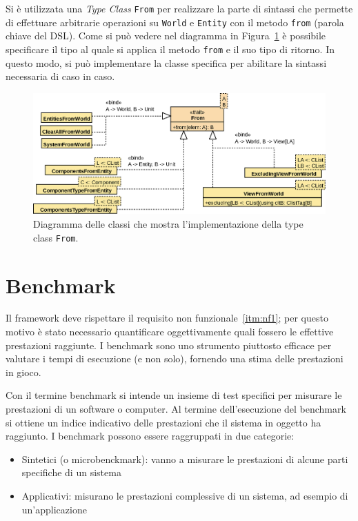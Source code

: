 

Si è utilizzata una \textit{Type Class} \texttt{From} per realizzare la parte di sintassi che permette di effettuare
arbitrarie operazioni su \texttt{World} e \texttt{Entity} con il metodo \texttt{from} (parola chiave del DSL).
Come si può vedere nel diagramma in Figura~\ref{fig:from} è possibile specificare il tipo al quale si applica il metodo
\texttt{from} e il suo tipo di ritorno.
In questo modo, si può implementare la classe specifica per abilitare la sintassi necessaria di caso in caso.

\begin{figure}[H]
    \centering
    \includegraphics[width=\textwidth]{./img/From}
    \caption{Diagramma delle classi che mostra l'implementazione della type class \texttt{From}.}
    \label{fig:from}
\end{figure}

\section{Benchmark}\label{sec:benchmark}
Il framework deve rispettare il requisito non funzionale~\ref{itm:nf1};
per questo motivo è stato necessario quantificare oggettivamente quali fossero le effettive prestazioni raggiunte.
I benchmark sono uno strumento piuttosto efficace per valutare i tempi di esecuzione (e non solo), fornendo
una stima delle prestazioni in gioco.

Con il termine benchmark si intende un insieme di test specifici per misurare le prestazioni di un software o computer.
Al termine dell'esecuzione del benchmark si ottiene un indice indicativo delle prestazioni che il sistema in oggetto ha
raggiunto.
I benchmark possono essere raggruppati in due categorie:
\begin{itemize}
    \item Sintetici (o microbenckmark): vanno a misurare le prestazioni di alcune parti specifiche di un sistema
    \item Applicativi: misurano le prestazioni complessive di un sistema, ad esempio di un'applicazione
\end{itemize}

